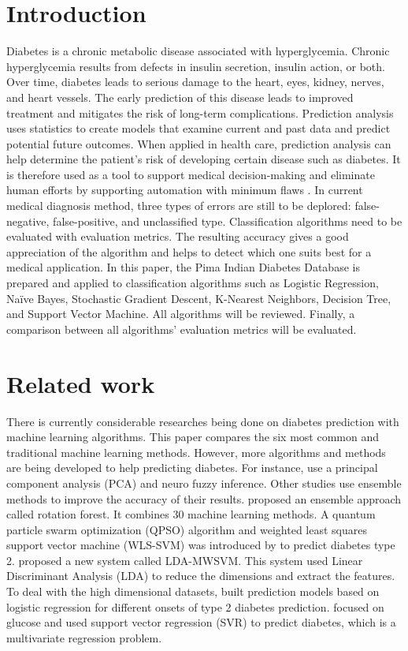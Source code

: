 \documentclass[11pt]{article}
\begin{document}
	\section{Introduction}
	Diabetes is a chronic metabolic disease associated with hyperglycemia. Chronic hyperglycemia results from defects in insulin secretion, insulin action, or both. Over time, diabetes leads to serious damage to the heart, eyes, kidney, nerves, and heart vessels. The early prediction of this disease leads to improved treatment and mitigates the risk of long-term complications. Prediction analysis uses statistics to create models that examine current and past data and predict potential future outcomes. When applied in health care, prediction analysis can help determine the patient’s risk of developing certain disease such as diabetes. It is therefore used as a tool to support medical decision-making and eliminate human efforts by supporting automation with minimum flaws \cite{MUJUMDAR2019292}. In current medical diagnosis method, three types of errors are still to be deplored: false-negative, false-positive, and unclassified type.	
	\bigbreak
	Classification algorithms need to be evaluated with evaluation metrics. The resulting accuracy gives a good appreciation of the algorithm and helps to detect which one suits best for a medical application. In this paper, the Pima Indian Diabetes Database \cite{Pima} is prepared and applied to classification algorithms such as Logistic Regression, Naïve Bayes, Stochastic Gradient Descent, K-Nearest Neighbors, Decision Tree, and Support Vector Machine. All algorithms will be reviewed. Finally, a comparison between all algorithms’ evaluation metrics will be evaluated.
	
	\section{Related work}
	There is currently considerable researches being done on diabetes prediction with machine learning algorithms. This paper compares the six most common and traditional machine learning methods. However, more algorithms and methods are being developed to help predicting diabetes. For instance, \citeauthor{POLAT2007702} \cite{POLAT2007702} use a principal component analysis (PCA) and neuro fuzzy inference. Other studies use ensemble methods to improve the accuracy of their results. \citeauthor{OZCIFT2011443} \cite{OZCIFT2011443} proposed an ensemble approach called rotation forest. It combines 30 machine learning methods. A quantum particle swarm optimization (QPSO) algorithm and weighted least squares support vector machine (WLS-SVM) was introduced by \citeauthor{Chen} to predict diabetes type 2. \citeauthor{Duygu} \cite{Duygu} proposed a new system called LDA-MWSVM. This system used Linear Discriminant Analysis (LDA) to reduce the dimensions and extract the features. To deal with the high dimensional datasets, \citeauthor{Razavian} \cite{Razavian} built prediction models based on logistic regression for different onsets of type 2 diabetes prediction. \citeauthor{Georga} \cite{Georga} focused on glucose and used support vector regression (SVR) to predict diabetes, which is a multivariate regression problem.
\end{document}
